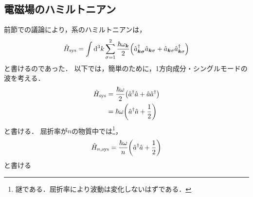 \documentclass{report}
\begin{document}
  \subsection{電磁場のハミルトニアン}
    前節での議論により，系のハミルトニアンは，
    \begin{align}
      \hat{H}_{\mathrm{sys}} = \int\dd[3]{k} \sum_{\sigma = 1}^{2}\frac{\hbar\omega_{\bm{k}}}{2}\qty(\hat{a}_{\bm{k\sigma}}^{\dag}\hat{a}_{\bm{k}\sigma} + \hat{a}_{\bm{k}\sigma}\hat{a}_{\bm{k}\sigma}^{\dag})
    \end{align}
    と書けるのであった．
    以下では，簡単のために，1方向成分・シングルモードの波を考える．
    \begin{align}
      \hat{H}_{\mathrm{sys}} &= \frac{\hbar\omega}{2}\qty(\hat{a}^{\dag}\hat{a} + \hat{a}\hat{a}^{\dag}) \\ 
      &= \hbar\omega\qty(\hat{a}^{\dag}\hat{a} + \frac{1}{2})
    \end{align}
    と書ける．
    屈折率が$n$の物質中では\footnote{謎である．屈折率により波動は変化しないはずである．}，
    \begin{align}
      \hat{H}_{n, \mathrm{sys}} = \frac{\hbar\omega}{n}\qty(\hat{a}^{\dag}\hat{a} + \frac{1}{2})
    \end{align}
    と書ける
\end{document}
